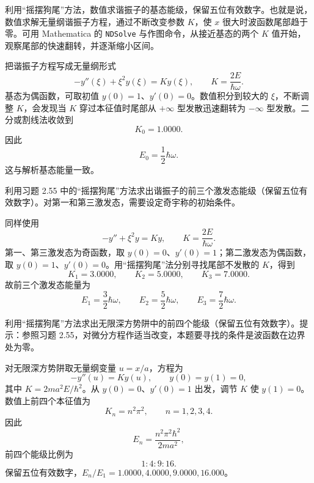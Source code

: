\begin{question}
利用“摇摆狗尾”方法，数值求谐振子的基态能级，保留五位有效数字。也就是说，数值求解无量纲谐振子方程，通过不断改变参数 $K$，使 $x$ 很大时波函数尾部趋于零。可用 Mathematica 的 \texttt{NDSolve} 与作图命令，从接近基态的两个 $K$ 值开始，观察尾部的快速翻转，并逐渐缩小区间。
\end{question}
\begin{solution}
把谐振子方程写成无量纲形式
\[
-y''(\xi)+\xi^2y(\xi)=Ky(\xi),
\qquad K=\frac{2E}{\hbar\omega}.
\]
基态为偶函数，可取初值 $y(0)=1$、$y'(0)=0$。数值积分到较大的 $\xi$，不断调整 $K$，会发现当 $K$ 穿过本征值时尾部从 $+\infty$ 型发散迅速翻转为 $-\infty$ 型发散。二分或割线法收敛到
\[
K_0=1.0000.
\]
因此
\[
E_0=\frac12\hbar\omega.
\]
这与解析基态能量一致。
\end{solution}

\begin{question}
利用习题 2.55 中的“摇摆狗尾”方法求出谐振子的前三个激发态能级（保留五位有效数字）。对第一和第三激发态，需要设定奇宇称的初始条件。
\end{question}
\begin{solution}
同样使用
\[
-y''+\xi^2y=Ky,
\qquad K=\frac{2E}{\hbar\omega}.
\]
第一、第三激发态为奇函数，取 $y(0)=0$、$y'(0)=1$；第二激发态为偶函数，取 $y(0)=1$、$y'(0)=0$。用“摇摆狗尾”法分别寻找尾部不发散的 $K$，得到
\[
K_1=3.0000,
\qquad
K_2=5.0000,
\qquad
K_3=7.0000.
\]
故前三个激发态能量为
\[
E_1=\frac32\hbar\omega,
\qquad
E_2=\frac52\hbar\omega,
\qquad
E_3=\frac72\hbar\omega.
\]
\end{solution}

\begin{question}
利用“摇摆狗尾”方法求出无限深方势阱中的前四个能级（保留五位有效数字）。提示：参照习题 2.55，对微分方程作适当改变，本题要寻找的条件是波函数在边界处为零。
\end{question}
\begin{solution}
对无限深方势阱取无量纲变量 $u=x/a$，方程为
\[
-y''(u)=Ky(u),
\qquad y(0)=y(1)=0,
\]
其中 $K=2ma^2E/\hbar^2$。从 $y(0)=0$、$y'(0)=1$ 出发，调节 $K$ 使 $y(1)=0$。数值上前四个本征值为
\[
K_n=n^2\pi^2,
\qquad n=1,2,3,4.
\]
因此
\[
E_n=\frac{n^2\pi^2\hbar^2}{2ma^2},
\]
前四个能级比例为
\[
1:4:9:16.
\]
保留五位有效数字，$E_n/E_1=1.0000,4.0000,9.0000,16.000$。
\end{solution}

